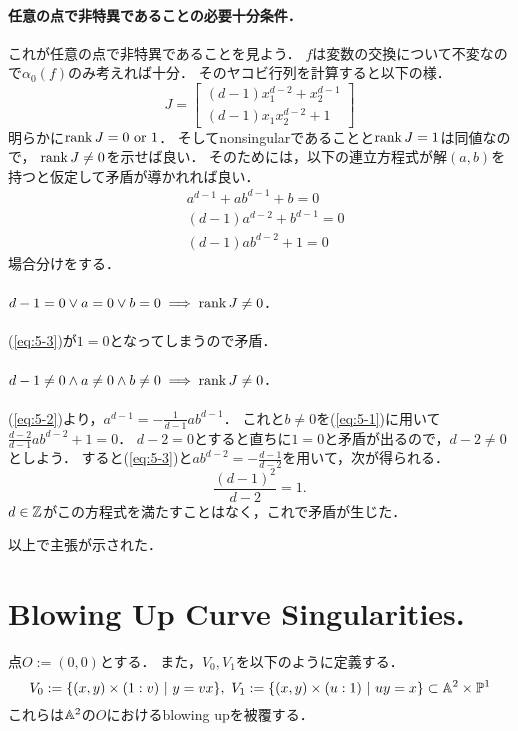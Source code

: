 \documentclass[a4paper]{jsarticle}
\begin{document}
    \paragraph{任意の点で非特異であることの必要十分条件．}
    これが任意の点で非特異であることを見よう．
    $f$は変数の交換について不変なので$\alpha_0(f)$のみ考えれば十分．
    そのヤコビ行列を計算すると以下の様．
    \[
        J=
        \begin{bmatrix}
            (d-1) x_1^{d-2}+x_2^{d-1} \\
            (d-1) x_1 x_2^{d-2}+1
        \end{bmatrix}
    \]
    明らかに$\operatorname{rank} J=0 \text{ or } 1$．
    そしてnonsingularであることと$\operatorname{rank} J=1$は同値なので，
    $\operatorname{rank} J \neq 0$を示せば良い．
    そのためには，以下の連立方程式が解$(a,b)$を持つと仮定して矛盾が導かれれば良い．
    \begin{align}
        &a^{d-1}+ab^{d-1}+b = 0 \label{eq:5-1}\\
        &(d-1)a^{d-2}+b^{d-1} = 0 \label{eq:5-2} \\
        &(d-1)a b^{d-2}+1 = 0 \label{eq:5-3}
    \end{align}
    場合分けをする．

    \paragraph{$d-1=0 \lor a=0 \lor b=0 \implies \operatorname{rank} J \neq 0$.}
    (\ref{eq:5-3})が$1=0$となってしまうので矛盾．

    \paragraph{$d-1 \neq 0 \land a \neq 0 \land b \neq 0 \implies \operatorname{rank} J \neq 0$.}
    (\ref{eq:5-2})より，$a^{d-1}=-\frac{1}{d-1} ab^{d-1}$．
    これと$b \neq 0$を(\ref{eq:5-1})に用いて$\frac{d-2}{d-1} ab^{d-2}+1=0$．
    $d-2=0$とすると直ちに$1=0$と矛盾が出るので，$d-2 \neq 0$としよう．
    すると(\ref{eq:5-3})と$ab^{d-2}=-\frac{d-1}{d-2}$を用いて，次が得られる．
    \[ \frac{(d-1)^2}{d-2}=1. \]
    $d \in \mathbb{Z}$がこの方程式を満たすことはなく，これで矛盾が生じた．

    以上で主張が示された．

\section{Blowing Up Curve Singularities.} %
    点$O:=(0,0)$とする．
    また，$V_0, V_1$を以下のように定義する．
    \[ V_0:=\{(x,y) \times (1:v) ~|~ y=vx \},~ V_1:=\{(x,y) \times (u:1) ~|~ uy=x \} \subset \mathbb{A}^2 \times \mathbb{P}^1 \]
    これらは$\mathbb{A}^2$の$O$におけるblowing upを被覆する．
\end{document}
